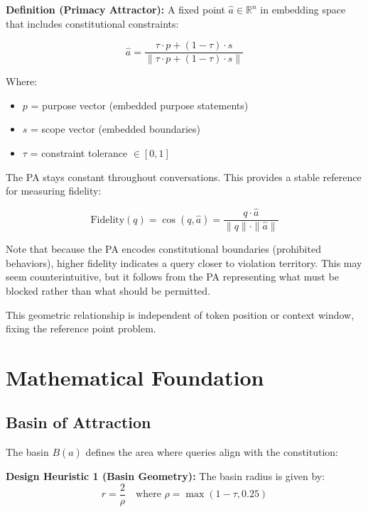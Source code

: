 \documentclass[11pt,a4paper]{article}
\begin{document}
\textbf{Definition (Primacy Attractor):} A fixed point $\hat{a} \in \mathbb{R}^n$ in embedding space that includes constitutional constraints:

\begin{equation}
\hat{a} = \frac{\tau \cdot p + (1-\tau) \cdot s}{\|\tau \cdot p + (1-\tau) \cdot s\|}
\end{equation}

Where:
\begin{itemize}
\item $p$ = purpose vector (embedded purpose statements)
\item $s$ = scope vector (embedded boundaries)
\item $\tau$ = constraint tolerance $\in [0,1]$
\end{itemize}

The PA stays constant throughout conversations. This provides a stable reference for measuring fidelity:

\begin{equation}
\text{Fidelity}(q) = \cos(q, \hat{a}) = \frac{q \cdot \hat{a}}{\|q\| \cdot \|\hat{a}\|}
\end{equation}

Note that because the PA encodes constitutional boundaries (prohibited behaviors), higher fidelity indicates a query closer to violation territory. This may seem counterintuitive, but it follows from the PA representing what must be blocked rather than what should be permitted.

This geometric relationship is independent of token position or context window, fixing the reference point problem.

\section{Mathematical Foundation}

\subsection{Basin of Attraction}

The basin $B(\hat{a})$ defines the area where queries align with the constitution:

\textbf{Design Heuristic 1 (Basin Geometry):} The basin radius is given by:
\begin{equation}
r = \frac{2}{\rho} \quad \text{where } \rho = \max(1-\tau, 0.25)
\end{equation}
\end{document}
